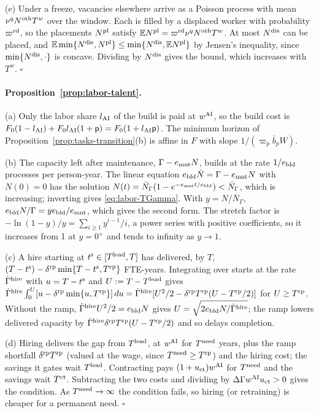 (e) Under a freeze, vacancies elsewhere arrive as a Poisson process with mean $\nu^qN^{\rm oth}T^w$ over the window. Each is filled by a displaced worker with probability $\varpi^{\rm rd}$, so the placements $N^{\rm pl}$ satisfy $\mathbb E N^{\rm pl}=\varpi^{\rm rd}\nu^qN^{\rm oth}T^w$. At most $N^{\rm dis}$ can be placed, and $\mathbb E\min\{N^{\rm dis},N^{\rm pl}\}\le\min\{N^{\rm dis},\mathbb EN^{\rm pl}\}$ by Jensen's inequality, since $\min\{N^{\rm dis},\cdot\}$ is concave. Dividing by $N^{\rm dis}$ gives the bound, which increases with $T^w$. $\square$

\paragraph{Proposition~\ref{prop:labor-talent}.}
(a) Only the labor share $l_{\rm AI}$ of the build is paid at $w^{\rm AI}$, so the build cost is $F_0(1-l_{\rm AI})+F_0l_{\rm AI}(1+\mathsf p)=F_0(1+l_{\rm AI}\mathsf p)$. The minimum horizon of Proposition~\ref{prop:tasks-transition}(b) is affine in $F$ with slope $1/(\varpi_p\bar b_pW)$.

(b) The capacity left after maintenance, $\Gamma-e_{\rm mnt}N$, builds at the rate $1/e_{\rm bld}$ processes per person-year. The linear equation $e_{\rm bld}\dot N=\Gamma-e_{\rm mnt}N$ with $N(0)=0$ has the solution $N(t)=\bar N_\Gamma(1-e^{-e_{\rm mnt}t/e_{\rm bld}})<\bar N_\Gamma$, which is increasing; inverting gives \eqref{eq:labor-TGamma}. With $y=N/\bar N_\Gamma$, $e_{\rm bld}N/\Gamma=ye_{\rm bld}/e_{\rm mnt}$, which gives the second form. The stretch factor is $-\ln(1-y)/y=\sum_{i\ge1}y^{i-1}/i$, a power series with positive coefficients, so it increases from 1 at $y=0^+$ and tends to infinity as $y\to1$.

(c) A hire starting at $t^{\rm s}\in[T^{\rm lead},T]$ has delivered, by $T$, $(T-t^{\rm s})-\delta^{\rm rp}\min\{T-t^{\rm s},T^{\rm rp}\}$ FTE-years. Integrating over starts at the rate $\dot\Gamma^{\rm hire}$ with $u=T-t^{\rm s}$ and $U:=T-T^{\rm lead}$ gives $\dot\Gamma^{\rm hire}\int_0^U[u-\delta^{\rm rp}\min\{u,T^{\rm rp}\}]\,du=\dot\Gamma^{\rm hire}[U^2/2-\delta^{\rm rp}T^{\rm rp}(U-T^{\rm rp}/2)]$ for $U\ge T^{\rm rp}$. Without the ramp, $\dot\Gamma^{\rm hire}U^2/2=e_{\rm bld}N$ gives $U=\sqrt{2e_{\rm bld}N/\dot\Gamma^{\rm hire}}$; the ramp lowers delivered capacity by $\dot\Gamma^{\rm hire}\delta^{\rm rp}T^{\rm rp}(U-T^{\rm rp}/2)$ and so delays completion.

(d) Hiring delivers the gap from $T^{\rm lead}$, at $w^{\rm AI}$ for $T^{\rm need}$ years, plus the ramp shortfall $\delta^{\rm rp}T^{\rm rp}$ (valued at the wage, since $T^{\rm need}\ge T^{\rm rp}$) and the hiring cost; the savings it gates wait $T^{\rm lead}$. Contracting pays $(1+u_{\rm ct})w^{\rm AI}$ for $T^{\rm need}$ and the savings wait $T^{\rm ct}$. Subtracting the two costs and dividing by $\Delta\Gamma w^{\rm AI}u_{\rm ct}>0$ gives the condition. As $T^{\rm need}\to\infty$ the condition fails, so hiring (or retraining) is cheaper for a permanent need. $\square$

